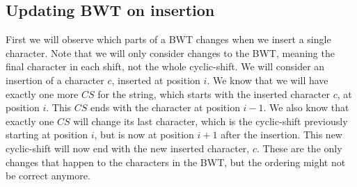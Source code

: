 \subsection*{Updating BWT on insertion}

First we will observe which parts of a BWT changes when we insert a single character. Note
that we will only consider changes to the BWT, meaning the final character in each shift,
not the whole cyclic-shift. We will consider an insertion of a character $c$, inserted at
position $i$. We know that we will have exactly one more $CS$ for the string, which starts
with the inserted character $c$, at position $i$. This $CS$ ends with the character at
position $i - 1$. We also know that exactly one $CS$ will change its last character, which
is the cyclic-shift previously starting at position $i$, but is now at position $i + 1$
after the insertion. This new cyclic-shift will now end with the new inserted character,
$c$. These are the only changes that happen to the characters in the BWT, but the ordering
might not be correct anymore.

\begin{table}[t]
	\begin{center}
        \hspace{1cm}
		\caption{BWT for string before and after insert}
		\label{table:bwtupdate}
	\end{center}
\end{table}

